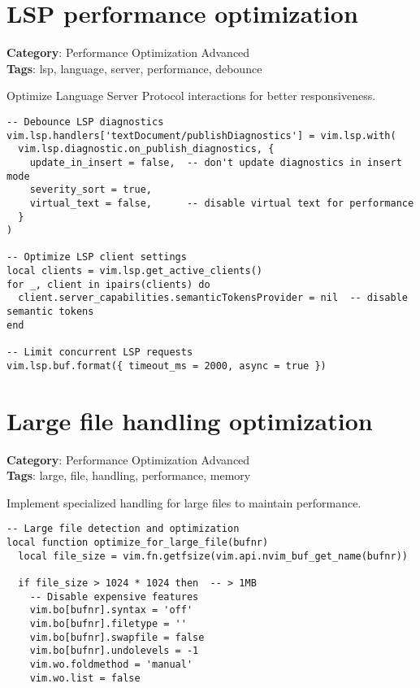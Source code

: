 {{{{{{{{{\section{LSP performance optimization}

\textbf{Category}: Performance Optimization Advanced\\ \textbf{Tags}: lsp, language, server, performance, debounce
\vspace{0.5cm}

Optimize Language Server Protocol interactions for better responsiveness.

\begin{Exa*}{}
\begin{Verbatim}[fontsize=\footnotesize, breaklines, breakanywhere]
-- Debounce LSP diagnostics
vim.lsp.handlers['textDocument/publishDiagnostics'] = vim.lsp.with(
  vim.lsp.diagnostic.on_publish_diagnostics, {
    update_in_insert = false,  -- don't update diagnostics in insert mode
    severity_sort = true,
    virtual_text = false,      -- disable virtual text for performance
  }
)

-- Optimize LSP client settings
local clients = vim.lsp.get_active_clients()
for _, client in ipairs(clients) do
  client.server_capabilities.semanticTokensProvider = nil  -- disable semantic tokens
end

-- Limit concurrent LSP requests
vim.lsp.buf.format({ timeout_ms = 2000, async = true })
\end{Verbatim}
\end{Exa*}

\section{Large file handling optimization}

\textbf{Category}: Performance Optimization Advanced\\ \textbf{Tags}: large, file, handling, performance, memory
\vspace{0.5cm}

Implement specialized handling for large files to maintain performance.

\begin{Exa*}{}
\begin{Verbatim}[fontsize=\footnotesize, breaklines, breakanywhere]
-- Large file detection and optimization
local function optimize_for_large_file(bufnr)
  local file_size = vim.fn.getfsize(vim.api.nvim_buf_get_name(bufnr))
  
  if file_size > 1024 * 1024 then  -- > 1MB
    -- Disable expensive features
    vim.bo[bufnr].syntax = 'off'
    vim.bo[bufnr].filetype = ''
    vim.bo[bufnr].swapfile = false
    vim.bo[bufnr].undolevels = -1
    vim.wo.foldmethod = 'manual'
    vim.wo.list = false
    

\end{Verbatim}
\end{Exa*}}}}}}}}}}
